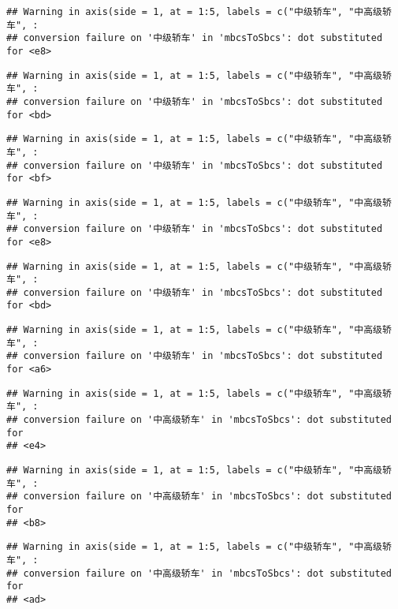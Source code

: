 \documentclass[]{article}
\begin{document}
\begin{verbatim}
## Warning in axis(side = 1, at = 1:5, labels = c("中级轿车", "中高级轿车", :
## conversion failure on '中级轿车' in 'mbcsToSbcs': dot substituted for <e8>
\end{verbatim}

\begin{verbatim}
## Warning in axis(side = 1, at = 1:5, labels = c("中级轿车", "中高级轿车", :
## conversion failure on '中级轿车' in 'mbcsToSbcs': dot substituted for <bd>
\end{verbatim}

\begin{verbatim}
## Warning in axis(side = 1, at = 1:5, labels = c("中级轿车", "中高级轿车", :
## conversion failure on '中级轿车' in 'mbcsToSbcs': dot substituted for <bf>
\end{verbatim}

\begin{verbatim}
## Warning in axis(side = 1, at = 1:5, labels = c("中级轿车", "中高级轿车", :
## conversion failure on '中级轿车' in 'mbcsToSbcs': dot substituted for <e8>
\end{verbatim}

\begin{verbatim}
## Warning in axis(side = 1, at = 1:5, labels = c("中级轿车", "中高级轿车", :
## conversion failure on '中级轿车' in 'mbcsToSbcs': dot substituted for <bd>
\end{verbatim}

\begin{verbatim}
## Warning in axis(side = 1, at = 1:5, labels = c("中级轿车", "中高级轿车", :
## conversion failure on '中级轿车' in 'mbcsToSbcs': dot substituted for <a6>
\end{verbatim}

\begin{verbatim}
## Warning in axis(side = 1, at = 1:5, labels = c("中级轿车", "中高级轿车", :
## conversion failure on '中高级轿车' in 'mbcsToSbcs': dot substituted for
## <e4>
\end{verbatim}

\begin{verbatim}
## Warning in axis(side = 1, at = 1:5, labels = c("中级轿车", "中高级轿车", :
## conversion failure on '中高级轿车' in 'mbcsToSbcs': dot substituted for
## <b8>
\end{verbatim}

\begin{verbatim}
## Warning in axis(side = 1, at = 1:5, labels = c("中级轿车", "中高级轿车", :
## conversion failure on '中高级轿车' in 'mbcsToSbcs': dot substituted for
## <ad>
\end{verbatim}
\end{document}
